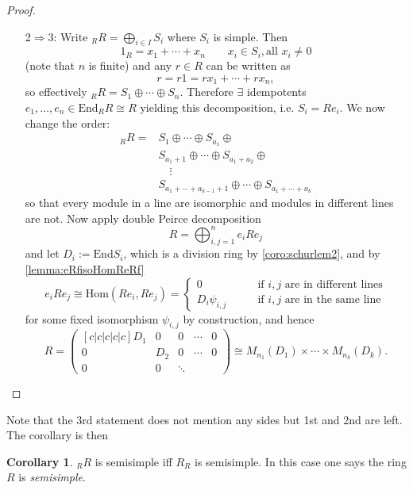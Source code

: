 \documentclass[a4paper]{article}
\newcommand{\End}{\text{End}}
\newcommand{\Hom}{\text{Hom}}
\theoremstyle{definition}
\newtheorem{coro}[defn]{Corollary}
\begin{document}
\begin{proof}
\begin{itemize}
\item[2$\Rightarrow$3:] Write $_RR=\bigoplus_{i\in I}S_i$ where $S_i$ is simple. Then
\[
1_R=x_1+\cdots+x_n\qquad x_i\in S_i,\text{all }x_i\neq 0
\]
(note that $n$ is finite) and any $r\in R$ can be written as
\[
r=r1=rx_1+\cdots+rx_n,
\]
so effectively $_RR=S_1\oplus\cdots\oplus S_n$. Therefore $\exists$ idempotents $e_1,\ldots,e_n\in\End_RR\cong R$ yielding this decomposition, i.e. $S_i=Re_i$. We now change the order:
\[
\begin{aligned}
_RR=&S_1\oplus\cdots\oplus S_{a_1}\oplus\\
&S_{a_1+1}\oplus\cdots\oplus S_{a_1+a_2}\oplus\\
&\quad \vdots \\
&S_{a_1+\cdots+a_{k-1}+1}\oplus\cdots\oplus S_{a_1+\cdots+a_k}
\end{aligned}
\]
so that every module in a line are isomorphic and modules in different lines are not. Now apply double Peirce decomposition
\[
R=\bigoplus_{i,j=1}^n e_iRe_j
\]
and let $D_i:=\End S_i$, which is a division ring by \ref{coro:schurlem2}, and by \ref{lemma:eRfisoHomReRf}
\[
e_iRe_j\cong\Hom(Re_i,Re_j)=\left\{
\begin{aligned}
0&\qquad \text{if }i,j\text{ are in different lines}\\
D_i\psi_{i,j}&\qquad \text{if }i,j\text{ are in the same line}
\end{aligned}
\right.
\]
for some fixed isomorphism $\psi_{i,j}$ by construction, and hence
\[
R=\begin{pmatrix}[c|c|c|c|c]
D_1 & 0 & 0 & \cdots & 0 \\\hline
0 & D_2 & 0 & \cdots & 0\\\hline
0 & 0 & \ddots & 
\end{pmatrix}\cong M_{n_1}(D_1)\times\cdots\times M_{n_k}(D_k).
\]
\end{itemize}
\end{proof}
Note that the 3rd statement does not mention any sides but 1st and 2nd are left. The corollary is then
\begin{coro}
\label{coro:lrsemisimpequiv}
$_RR$ is semisimple iff $R_R$ is semisimple. In this case one says the ring $R$ is \textit{semisimple}.
\end{coro}
\end{document}
